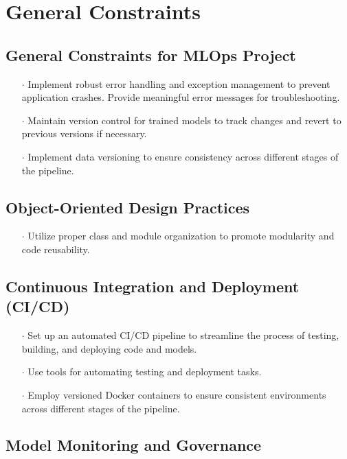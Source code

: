 \documentclass{report}
\begin{document}
\section{General Constraints}
\subsection{General Constraints for MLOps Project}

\begin{itemize}
    \item[$\cdot$] Implement robust error handling and exception management to prevent application crashes. Provide meaningful error messages for troubleshooting.
    \item[$\cdot$] Maintain version control for trained models to track changes and revert to previous versions if necessary.
    \item[$\cdot$] Implement data versioning to ensure consistency across different stages of the pipeline.
\end{itemize}

\subsection{Object-Oriented Design Practices}

\begin{itemize}
    \item[$\cdot$] Utilize proper class and module organization to promote modularity and code reusability.
\end{itemize}

\subsection{Continuous Integration and Deployment (CI/CD)}

\begin{itemize}
    \item[$\cdot$] Set up an automated CI/CD pipeline to streamline the process of testing, building, and deploying code and models.
    \item[$\cdot$] Use tools for automating testing and deployment tasks.
    \item[$\cdot$] Employ versioned Docker containers to ensure consistent environments across different stages of the pipeline.
\end{itemize}

\subsection{Model Monitoring and Governance}
\end{document}
